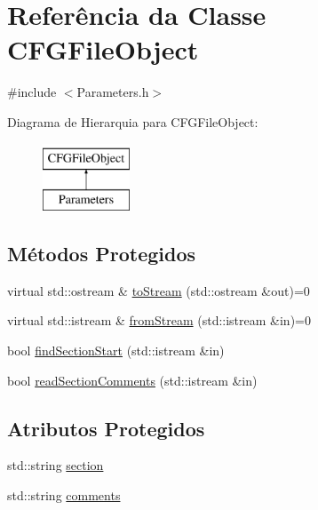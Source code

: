 \hypertarget{class_c_f_g_file_object}{\section{Referência da Classe C\-F\-G\-File\-Object}
\label{class_c_f_g_file_object}
}


{\ttfamily \#include $<$Parameters.\-h$>$}

Diagrama de Hierarquia para C\-F\-G\-File\-Object\-:\begin{figure}[H]
\begin{center}
\leavevmode
\includegraphics[height=2.000000cm]{class_c_f_g_file_object}
\end{center}
\end{figure}
\subsection*{Métodos Protegidos}
\begin{DoxyCompactItemize}
\item 
virtual std\-::ostream \& \hyperlink{class_c_f_g_file_object_aac9312bca4de84d2b2330af9857a400c}{to\-Stream} (std\-::ostream \&out)=0
\item 
virtual std\-::istream \& \hyperlink{class_c_f_g_file_object_a561dcc20e3c1db7e38868269b464ca86}{from\-Stream} (std\-::istream \&in)=0
\item 
bool \hyperlink{class_c_f_g_file_object_a4b417d2e16fc8c2c9fed64546b8b2d86}{find\-Section\-Start} (std\-::istream \&in)
\item 
bool \hyperlink{class_c_f_g_file_object_a56a717efd9097cde9bdf029b5c93e9bd}{read\-Section\-Comments} (std\-::istream \&in)
\end{DoxyCompactItemize}
\subsection*{Atributos Protegidos}
\begin{DoxyCompactItemize}
\item 
std\-::string \hyperlink{class_c_f_g_file_object_a7d62f5a9b853173c9d36e315c3de21b3}{section}
\item 
std\-::string \hyperlink{class_c_f_g_file_object_ad5bd5931f86c7843eeaca0c7a240e647}{comments}
\end{DoxyCompactItemize}
